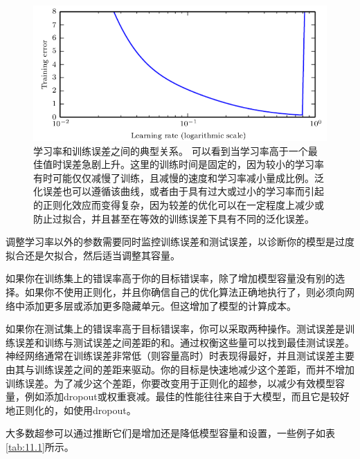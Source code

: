 \begin{figure}[htbp] %
   \centering
   \includegraphics[width=6in]{fig/chap11/11_1.png} 
   \caption{学习率和训练误差之间的典型关系。 可以看到当学习率高于一个最佳值时误差急剧上升。这里的训练时间是固定的，因为较小的学习率有时可能仅仅减慢了训练，且减慢的速度和学习率减小量成比例。泛化误差也可以遵循该曲线，或者由于具有过大或过小的学习率而引起的正则化效应而变得复杂，因为较差的优化可以在一定程度上减少或防止过拟合，并且甚至在等效的训练误差下具有不同的泛化误差。}
   \label{fig:11_1}
\end{figure}

调整学习率以外的参数需要同时监控训练误差和测试误差，以诊断你的模型是过度拟合还是欠拟合，然后适当调整其容量。

如果你在训练集上的错误率高于你的目标错误率，除了增加模型容量没有别的选择。如果你不使用正则化，并且你确信自己的优化算法正确地执行了，则必须向网络中添加更多层或添加更多隐藏单元。但这增加了模型的计算成本。

如果你在测试集上的错误率高于目标错误率，你可以采取两种操作。测试误差是训练误差和训练与测试误差之间差距的和。通过权衡这些量可以找到最佳测试误差。神经网络通常在训练误差非常低（则容量高时）时表现得最好，并且测试误差主要由其与训练误差之间的差距来驱动。你的目标是快速地减少这个差距，而并不增加训练误差。为了减少这个差距，你要改变用于正则化的超参，以减少有效模型容量，例如添加dropout或权重衰减。最佳的性能往往来自于大模型，而且它是较好地正则化的，如使用dropout。

大多数超参可以通过推断它们是增加还是降低模型容量和设置，一些例子如表\ref{tab:11.1}所示。

